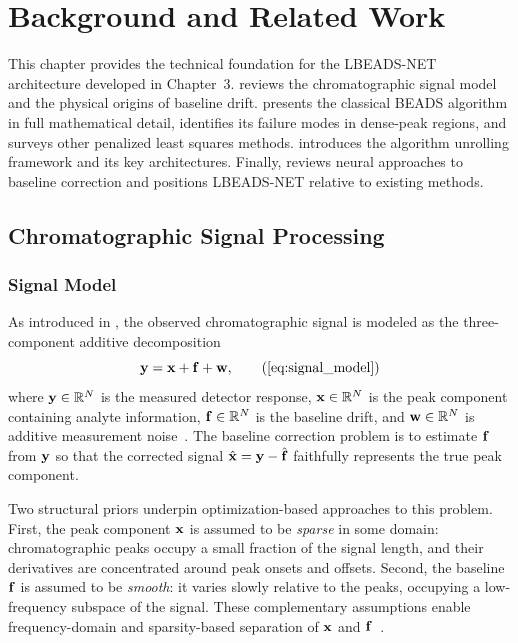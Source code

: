 \chapter{Background and Related Work}
\label{chap:background}

This chapter provides the technical foundation for the LBEADS-NET architecture developed in Chapter~3.  reviews the chromatographic signal model and the physical origins of baseline drift.  presents the classical BEADS algorithm in full mathematical detail, identifies its failure modes in dense-peak regions, and surveys other penalized least squares methods.  introduces the algorithm unrolling framework and its key architectures. Finally,  reviews neural approaches to baseline correction and positions LBEADS-NET relative to existing methods.


\section{Chromatographic Signal Processing}
\label{sec:bg_signal}

\subsection{Signal Model}

As introduced in , the observed chromatographic signal is modeled as the three-component additive decomposition
\begin{equation}
    \yvec = \xvec + \fvec + \wvec,
    \tag{\ref{eq:signal_model}}
\end{equation}
where $\mathbf{y} \in {\mathbb R}^N$ is the measured detector response, $\mathbf{x} \in {\mathbb R}^N$ is the peak component containing analyte information, $\mathbf{f} \in {\mathbb R}^N$ is the baseline drift, and $\mathbf{w} \in {\mathbb R}^N$ is additive measurement noise~\cite{ning2014beads}. The baseline correction problem is to estimate $\mathbf{f}$ from $\mathbf{y}$ so that the corrected signal $\hat{\mathbf{x}} = \mathbf{y} - \hat{\mathbf{f}}$ faithfully represents the true peak component.

Two structural priors underpin optimization-based approaches to this problem. First, the peak component $\mathbf{x}$ is assumed to be \emph{sparse} in some domain: chromatographic peaks occupy a small fraction of the signal length, and their derivatives are concentrated around peak onsets and offsets. Second, the baseline $\mathbf{f}$ is assumed to be \emph{smooth}: it varies slowly relative to the peaks, occupying a low-frequency subspace of the signal. These complementary assumptions enable frequency-domain and sparsity-based separation of $\mathbf{x}$ and $\mathbf{f}$~\cite{ning2014beads}.

